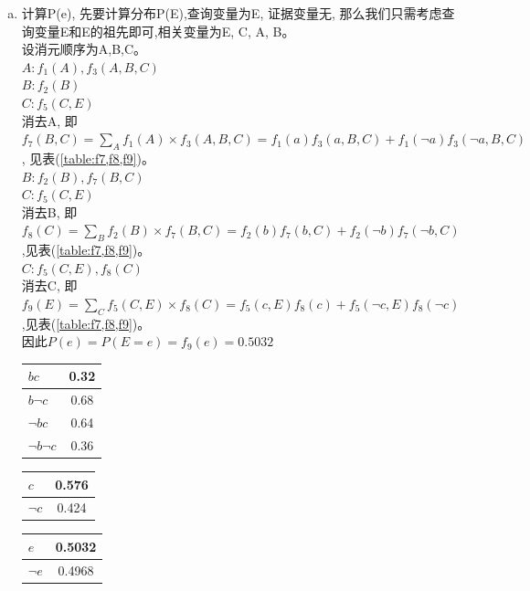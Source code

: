 \documentclass[a4paper, 11pt]{article}
\begin{document}
\begin{enumerate}
    \begin{enumerate}[(a)]
      \item 计算P(e), 先要计算分布P(E),查询变量为E, 证据变量无,
      那么我们只需考虑查询变量E和E的祖先即可,相关变量为E, C, A, B。\\
      设消元顺序为A,B,C。\\
      $A: f_{1}(A), f_{3}(A,B,C)$\\
      $B: f_{2}(B)$\\
      $C: f_{5}(C,E)$\\
      消去A, 即$f_{7}(B,C) = \sum_{A}f_{1}(A) \times f_{3}(A,B,C) = f_{1}(a)f_{3}(a,B,C) + f_{1}(\lnot a)f_{3}(\lnot a,B,C)$,
      见表(\ref{table:f7,f8,f9})。\\
      $B: f_{2}(B), f_{7}(B,C)$\\
      $C: f_{5}(C,E)$\\
      消去B, 即$f_{8}(C) = \sum_{B}f_{2}(B) \times f_{7}(B,C) = f_{2}(b)f_{7}(b,C) + f_{2}(\lnot b)f_{7}(\lnot b,C)$
      ,见表(\ref{table:f7,f8,f9})。\\
      $C:f_{5}(C,E), f_{8}(C)$\\
      消去C, 即$f_{9}(E) = \sum_{C}f_{5}(C,E) \times f_{8}(C) = f_{5}(c,E)f_{8}(c) + f_{5}(\lnot c,E)f_{8}(\lnot c)$
      ,见表(\ref{table:f7,f8,f9})。\\
      因此$P(e)=P(E=e)=f_{9}(e)=0.5032$
      \begin{table}[!htbp]
        \centering
        \begin{tabular}{|l|c|}
          \hline
          $bc$&0.32\\
          \hline
          $b\lnot c$&0.68\\
          \hline
          $\lnot bc$&0.64\\
          \hline
          $\lnot b\lnot c$&0.36\\
          \hline
        \end{tabular}
        \begin{tabular}{|l|c|}
          \hline
          $c$&0.576\\
          \hline
          $\lnot c$&0.424\\
          \hline
        \end{tabular}
        \begin{tabular}{|l|c|}
          \hline
          $e$&0.5032\\
          \hline
          $\lnot e$&0.4968\\
          \hline
        \end{tabular}

\end{table}
\end{enumerate}
\end{enumerate}
\end{document}
